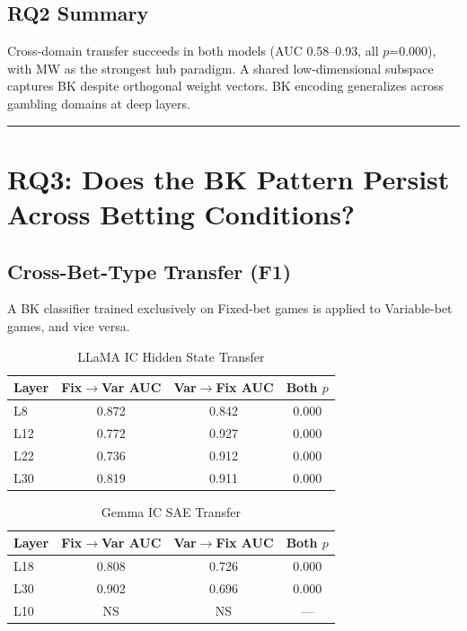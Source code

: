 \documentclass[11pt,a4paper]{article}
\begin{document}
\subsection{RQ2 Summary}

Cross-domain transfer succeeds in both models (AUC 0.58--0.93, all $p$=0.000), with MW as the strongest hub paradigm. A shared low-dimensional subspace captures BK despite orthogonal weight vectors. BK encoding generalizes across gambling domains at deep layers.

\bigskip\hrule\bigskip

\section{RQ3: Does the BK Pattern Persist Across Betting Conditions?}

\subsection{Cross-Bet-Type Transfer (F1)}

A BK classifier trained exclusively on Fixed-bet games is applied to Variable-bet games, and vice versa.

\begin{table}[H]
\centering
\caption{LLaMA IC Hidden State Transfer}
\begin{tabular}{lccc}
\toprule
\textbf{Layer} & \textbf{Fix$\rightarrow$Var AUC} & \textbf{Var$\rightarrow$Fix AUC} & \textbf{Both $p$} \\
\midrule
L8 & 0.872 & 0.842 & 0.000 \\
L12 & 0.772 & 0.927 & 0.000 \\
L22 & 0.736 & 0.912 & 0.000 \\
L30 & 0.819 & 0.911 & 0.000 \\
\bottomrule
\end{tabular}
\end{table}

\begin{table}[H]
\centering
\caption{Gemma IC SAE Transfer}
\begin{tabular}{lccc}
\toprule
\textbf{Layer} & \textbf{Fix$\rightarrow$Var AUC} & \textbf{Var$\rightarrow$Fix AUC} & \textbf{Both $p$} \\
\midrule
L18 & 0.808 & 0.726 & 0.000 \\
L30 & 0.902 & 0.696 & 0.000 \\
L10 & NS & NS & --- \\
\bottomrule
\end{tabular}
\end{table}
\end{document}
